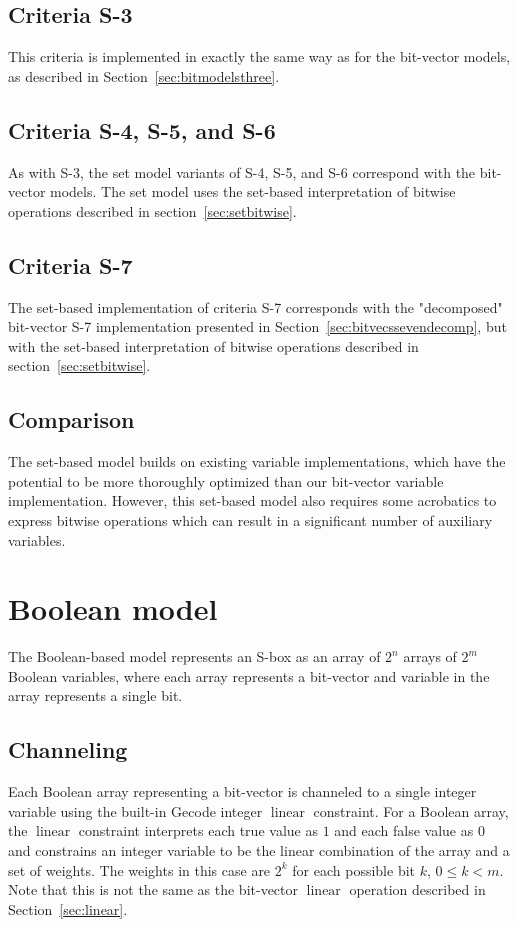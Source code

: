 \documentclass[a4paper,10pt,twoside,openright]{book}
\DeclareMathOperator{\lin}{linear}
\begin{document}
\subsection{Criteria S-3}
This criteria is implemented in exactly the same way as for the bit-vector models,
as described in Section~\ref{sec:bitmodelsthree}.

\subsection{Criteria S-4, S-5, and S-6}
As with S-3, the set model variants of S-4, S-5, and S-6 correspond with the bit-vector models. 
The set model uses the set-based interpretation of bitwise operations described in 
section~\ref{sec:setbitwise}.

\subsection{Criteria S-7}
The set-based implementation of criteria S-7 corresponds with the "decomposed" bit-vector S-7
implementation presented in Section~\ref{sec:bitvecssevendecomp}, but with
the set-based interpretation of bitwise operations described in
section~\ref{sec:setbitwise}.

\subsection{Comparison}
The set-based model builds on existing variable implementations, which have the potential
to be more thoroughly optimized than our bit-vector variable implementation.
However, this set-based model also requires some acrobatics to express bitwise operations
which can result in a significant number of auxiliary variables.

\section{Boolean model}
\label{sec:boolmodel}
The Boolean-based model represents an S-box as an array of $2^n$ arrays of $2^m$ Boolean variables,
where each array represents a bit-vector and
variable in the array represents a single bit.

\subsection{Channeling}
\label{sec:boolchanneling}
Each Boolean array representing a bit-vector is channeled to a single integer variable
using the built-in Gecode integer $\lin$ constraint. 
For a Boolean array, the $\lin$ constraint interprets each true value as $1$ and each
false value as $0$ and 
constrains an integer variable to 
be the linear combination of the array and a set of weights.
The weights in this case are $2^k$ for each possible bit $k$, $0 \leq k < m$.
Note that this is not the same as the bit-vector $\lin$ operation described in Section~\ref{sec:linear}.
\end{document}
